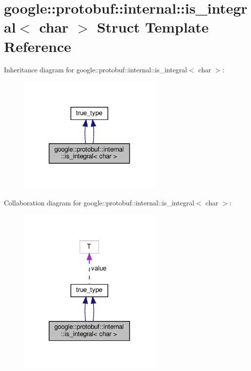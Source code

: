 \hypertarget{structgoogle_1_1protobuf_1_1internal_1_1is__integral_3_01char_01_4}{}\section{google\+:\+:protobuf\+:\+:internal\+:\+:is\+\_\+integral$<$ char $>$ Struct Template Reference}
\label{structgoogle_1_1protobuf_1_1internal_1_1is__integral_3_01char_01_4}


Inheritance diagram for google\+:\+:protobuf\+:\+:internal\+:\+:is\+\_\+integral$<$ char $>$\+:
\nopagebreak
\begin{figure}[H]
\begin{center}
\leavevmode
\includegraphics[width=204pt]{structgoogle_1_1protobuf_1_1internal_1_1is__integral_3_01char_01_4__inherit__graph}
\end{center}
\end{figure}


Collaboration diagram for google\+:\+:protobuf\+:\+:internal\+:\+:is\+\_\+integral$<$ char $>$\+:
\nopagebreak
\begin{figure}[H]
\begin{center}
\leavevmode
\includegraphics[width=204pt]{structgoogle_1_1protobuf_1_1internal_1_1is__integral_3_01char_01_4__coll__graph}
\end{center}
\end{figure}
